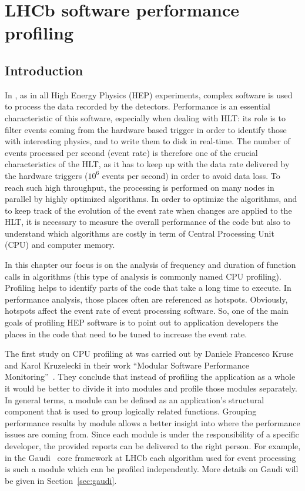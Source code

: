 \chapter{LHCb software performance profiling}
\section{Introduction}

In \lhcb, as in all High Energy Physics (HEP) experiments, complex software is
used to process the data recorded by the detectors. Performance is an essential
characteristic of this software, especially when dealing with HLT: its role is
to filter events coming from the hardware based trigger in order to identify
those with interesting physics, and to write them to disk in real-time. The
number of events processed per second (event rate) is therefore one of the
crucial characteristics of the HLT, as it has to keep up with the data rate
delivered by the hardware triggers ($10^6$ events per second) in order to avoid
data loss. To reach such high throughput, the processing is performed on many
nodes in parallel by highly optimized algorithms. In order to optimize the
algorithms, and to keep track of the evolution of the event rate when changes
are applied to the HLT, it is necessary to measure the overall performance of
the code but also to understand which algorithms are costly in term of Central
Processing Unit (CPU) and computer memory.

In this chapter our focus is on the analysis of frequency and duration of
function calls in algorithms (this type of analysis is commonly named CPU
profiling). Profiling helps to identify parts of the code that take a long time
to execute. In performance analysis, those places often are referenced as
hotspots. Obviously,  hotspots affect the event rate of event processing
software. So, one of the main goals of profiling HEP software is to point out
to application developers the places in the code that need to be tuned to
increase the event rate.

The first study on CPU profiling at \lhcb was carried out by Daniele Francesco
Kruse and Karol Kruzelecki in their work ``Modular Software Performance
Monitoring''~\cite{modular}. They conclude that instead of profiling the
application as a whole it would be better to divide it into modules and profile
those modules separately. In general terms, a module can be defined as an
application’s structural component that is used to group logically related
functions.  Grouping performance results by module allows a better insight into
where the performance issues are coming from. Since each module is under the
responsibility of a specific developer, the provided reports can be delivered
to the right person. For example, in the Gaudi~\cite{Barrand:2001ny} core
framework at LHCb each algorithm used for event processing is such a module
which can be profiled independently. More details on Gaudi will be given in
Section~\ref{sec:gaudi}.

